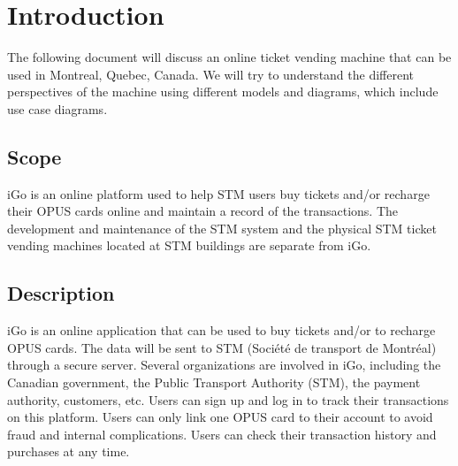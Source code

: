\documentclass[a4paper,12pt]{article}
\begin{document}
\newcommand{\CC}{C\nolinebreak\hspace{-.05em}\raisebox{.4ex}{\tiny\bf +}\nolinebreak\hspace{-.10em}\raisebox{.4ex}{\tiny\bf +}}
\def\CC{{C\nolinebreak[4]\hspace{-.05em}\raisebox{.4ex}{\tiny\bf ++}}}

\tableofcontents
\newpage
\section{Introduction}
The following document will discuss an online ticket vending machine that can be used in Montreal, Quebec, Canada. We will try to understand the different perspectives of the machine using different models and diagrams, which include use case diagrams.
\subsection{Scope}
iGo is an online platform used to help STM users buy tickets and/or recharge their OPUS cards online and maintain a record of the transactions. The development and maintenance of the STM system and the physical STM ticket vending machines located at STM buildings are separate from iGo.
\subsection{Description}
iGo is an online application that can be used to buy tickets and/or to recharge OPUS cards. The data will be sent to STM (Société de transport de Montréal) through a secure server. Several organizations are involved in iGo, including the Canadian government, the Public Transport Authority (STM), the payment authority, customers, etc. Users can sign up and log in to track their transactions on this platform. Users can only link one OPUS card to their account to avoid fraud and internal complications. Users can check their transaction history and purchases at any time. \\
\end{document}
